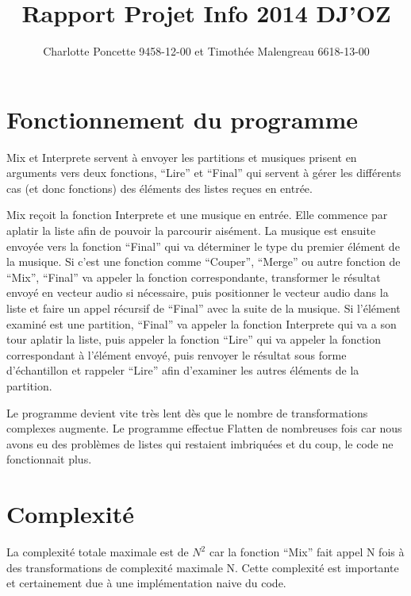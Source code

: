 \documentclass[a4paper,10pt]{article}
\title{Rapport Projet Info 2014 DJ'OZ}
\author{Charlotte Poncette 9458-12-00 et Timothée Malengreau 6618-13-00}
\begin{document}
\maketitle

\section{Fonctionnement du programme}

Mix et Interprete servent à envoyer les partitions et musiques prisent en arguments vers deux fonctions, ``Lire'' et ``Final'' qui servent à gérer
les différents cas (et donc fonctions) des éléments des listes reçues en entrée.
\bigskip

Mix reçoit la fonction Interprete et une musique en entrée. Elle commence par aplatir la liste afin de pouvoir la parcourir aisément.
La musique est ensuite envoyée vers la fonction ``Final'' qui va déterminer le type du premier élément de la musique. Si c'est une fonction 
comme ``Couper'', ``Merge'' ou autre fonction de ``Mix'', ``Final'' va appeler la fonction correspondante, transformer le résultat envoyé 
en vecteur audio si nécessaire, puis positionner le vecteur audio dans la liste et faire un appel récursif de ``Final'' avec la suite de la musique.
Si l'élément examiné est une partition, ``Final''  va appeler la fonction Interprete qui va a son tour aplatir la liste, puis appeler la fonction
``Lire'' qui va appeler la fonction correspondant à l'élément envoyé, puis renvoyer le résultat sous forme d'échantillon et rappeler ``Lire'' afin
d'examiner les autres éléments de la partition. 
\bigskip

Le programme devient vite très lent dès que le nombre de transformations complexes augmente. Le programme effectue Flatten de nombreuses fois car
nous avons eu des problèmes de listes qui restaient imbriquées et du coup, le code ne fonctionnait plus.

\section{Complexité}

La complexité totale maximale est de $N^2$ car la fonction ``Mix'' fait appel N fois à des transformations de complexité maximale N. 
Cette complexité est importante et certainement due à une implémentation naive du code. 
\end{document}
